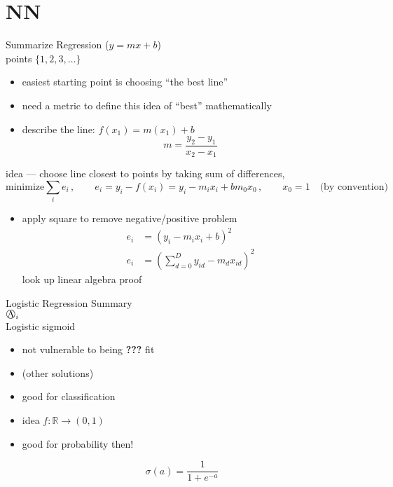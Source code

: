 \section{NN}

 
 Summarize Regression ($y=mx+b$)\\
points $\{1,2,3,\ldots\}$\\
\begin{itemize}
\item easiest starting point is choosing ``the best line''
\item need a metric to define this idea of ``best'' mathematically
\item describe the line: $f(x_1)=m(x_1)+b$
\begin{equation*}
m=\frac{y_2-y_1}{x_2-x_1}
\end{equation*}
\end{itemize}
idea --- choose line closest to points by taking sum of differences,
\begin{equation*}
\text{minimize}\sum_i e_i\,, \qquad e_i=y_i-f(x_i)=y_i-m_i x_i + b m_0 x_0\,, \qquad x_0 = 1 \quad \text{(by convention)}
\end{equation*}
\begin{itemize}
\item apply square to remove negative/positive problem
\begin{align*}
e_i & = ( y_i - m_i x_i + b )^2 \\
e_i & = \left(  \sum_{d=0}^{D} y_{id}-m_d x_{id}\right)^2
\end{align*}
look up linear algebra proof
\end{itemize}

\newpage

Logistic Regression Summary\\

$\circled{A}_i$\\

Logistic sigmoid
\begin{itemize}[label=--]
\item not vulnerable to being \textbf{???} fit
\item (other solutions)
\item good for classification
\item idea $f:\mathbb{R}\to(0,1)$
\item good for probability then!
\end{itemize}

\begin{equation*}
\sigma(a) = \frac{1}{1+e^{-a}}
\end{equation*}

